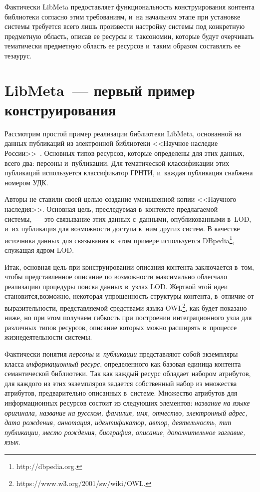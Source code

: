 \begin{multicols}{2}
     Фактически LibMeta предоставляет функциональность 
конструирования контента библиотеки согласно этим требованиям, и~на 
начальном этапе при установке системы требуется всего лишь произвести 
настройку системы под конкретную предметную область, описав ее ресурсы и~таксономии, которые будут очерчивать тематически предметную область 
ее ресурсов и~таким образом составлять ее тезаурус. 


     
\section{LibMeta~--- первый пример конструирования}



     Рассмотрим простой пример реализации биб\-лио\-те\-ки LibMeta, 
основанной на данных публикаций из электронной библиотеки <<Научное 
наследие России>>~\cite{7-ser}. Основных типов ресурсов, которые 
определены для этих данных, всего два: персоны и~публикации. Для 
тематической классификации этих публикаций используется классификатор 
\mbox{ГРНТИ}, и~каждая публикация снабжена номером УДК.
     
     Авторы не ставили своей целью создание уменьшенной копии 
<<Научного наследия>>. Основная цель, преследуемая в~контексте 
предлагаемой сис\-те\-мы,~--- это связывание этих данных с~данными, 
опубликованными в~LOD, и~их публикация для возможности доступа к~ним 
других систем. В качестве источника данных для связывания в~этом примере 
используется DBpedia\footnote{{\sf http://dbpedia.org.}}, служащая ядром LOD. 
     
     Итак, основная цель при конструировании описа\-ния контента 
заключается в~том, чтобы пред\-став\-лен\-ное описание по возможности 
макси\-мально облегчало реализацию процедуры поиска данных в~узлах LOD. 
Жертвой этой идеи становится,\linebreak возможно, некоторая упро\-щен\-ность 
структуры контента, в~отличие от выразительности, пред\-став\-ля\-емой 
средствами языка OWL\footnote{{\sf https://www.w3.org/2001/sw/wiki/OWL.}}, как 
будет показано ниже, но при этом получаем гибкость при по\-стро\-ении 
интеграционного узла для различных типов ресурсов, описание которых 
можно расширять в~процессе жизнедеятельности системы. 
     
     Фактически понятия \textit{персоны} и~\textit{пуб\-ли\-ка\-ции} 
представляют собой экземпляры класса \textit{информационный ресурс}, 
определенного как базовая единица контента семантической библиотеки. Так 
как каждый ресурс обладает набором атрибутов, для каждого из этих 
экземпляров задается собственный набор из множества атрибутов, 
предварительно описанных в~системе. Множество атрибутов для 
информационных ресурсов состоит из следующих элементов: \textit{название 
на языке оригинала, название на русском, фамилия, имя, отчество, 
электронный адрес, дата рождения, аннотация, идентификатор, автор, 
деятельность, тип публикации, место рождения, биография, описание, 
дополнительное заглавие, язык}. 
     

\end{multicols}

